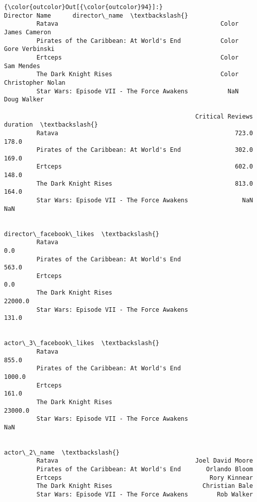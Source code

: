 \documentclass[11pt]{article}
\begin{document}
\begin{Verbatim}[commandchars=\\\{\}]
{\color{outcolor}Out[{\color{outcolor}94}]:}                                            Director Name      director\_name  \textbackslash{}
         Ratava                                             Color      James Cameron   
         Pirates of the Caribbean: At World's End           Color     Gore Verbinski   
         Ertceps                                            Color         Sam Mendes   
         The Dark Knight Rises                              Color  Christopher Nolan   
         Star Wars: Episode VII - The Force Awakens           NaN        Doug Walker   
         
                                                     Critical Reviews  duration  \textbackslash{}
         Ratava                                                 723.0     178.0   
         Pirates of the Caribbean: At World's End               302.0     169.0   
         Ertceps                                                602.0     148.0   
         The Dark Knight Rises                                  813.0     164.0   
         Star Wars: Episode VII - The Force Awakens               NaN       NaN   
         
                                                     director\_facebook\_likes  \textbackslash{}
         Ratava                                                          0.0   
         Pirates of the Caribbean: At World's End                      563.0   
         Ertceps                                                         0.0   
         The Dark Knight Rises                                       22000.0   
         Star Wars: Episode VII - The Force Awakens                    131.0   
         
                                                     actor\_3\_facebook\_likes  \textbackslash{}
         Ratava                                                       855.0   
         Pirates of the Caribbean: At World's End                    1000.0   
         Ertceps                                                      161.0   
         The Dark Knight Rises                                      23000.0   
         Star Wars: Episode VII - The Force Awakens                     NaN   
         
                                                         actor\_2\_name  \textbackslash{}
         Ratava                                      Joel David Moore   
         Pirates of the Caribbean: At World's End       Orlando Bloom   
         Ertceps                                         Rory Kinnear   
         The Dark Knight Rises                         Christian Bale   
         Star Wars: Episode VII - The Force Awakens        Rob Walker   
         

\end{Verbatim}
\end{document}
